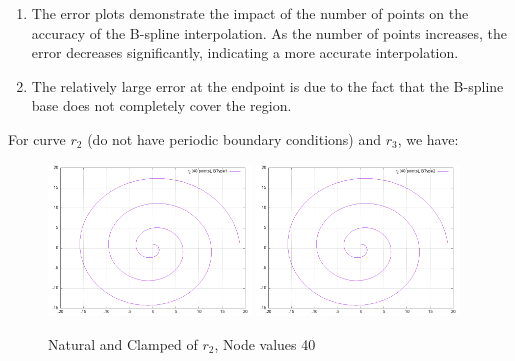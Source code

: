 \documentclass{article}
\begin{document}
\begin{enumerate}
    \item The error plots demonstrate the impact of the number of points on the accuracy of the B-spline interpolation. As the number of points increases, the error decreases significantly, indicating a more accurate interpolation.
    \item The relatively large error at the endpoint is due to the fact that the B-spline base does not completely cover the region.\
\end{enumerate}

For curve \(r_2\) (do not have periodic boundary conditions) and \(r_3\), we have:
\begin{figure}[H]
    \centering
    \includegraphics[width=0.48\textwidth]{../figure/B1r2spline_plot_40.png}
    \includegraphics[width=0.48\textwidth]{../figure/B2r2spline_plot_40.png}
    \caption{Natural and Clamped of \(r_2\), Node values 40}
\end{figure}
\end{document}
